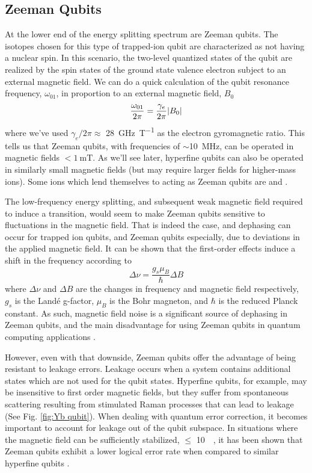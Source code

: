 \subsection{Zeeman Qubits}
At the lower end of the energy splitting spectrum are Zeeman qubits. The isotopes chosen for this type of trapped-ion qubit are characterized as not having a nuclear spin. In this scenario, the two-level quantized states of the qubit are realized by the spin states of the ground state valence electron subject to an external magnetic field. We can do a quick calculation of the qubit resonance frequency, $\omega_{01}$, in proportion to an external magnetic field, $B_0$
\begin{equation}
    \frac{\omega_{01}}{2\pi} = \frac{\gamma_e}{2\pi}\abs{B_0}
\end{equation}
where we've used $\gamma_e/2\pi \approx$ \SI{28}{\giga\hertz\per\tesla} as the electron gyromagnetic ratio. This tells us that Zeeman qubits, with frequencies of $\sim$\SI{10}{\mega\hertz}, can be operated in magnetic fields $< \SI{1}{\milli\tesla}$. As we'll see later, hyperfine qubits can also be operated in similarly small magnetic fields (but may require larger fields for higher-mass ions). Some ions which lend themselves to acting as Zeeman qubits are  and  \cite{Brown, Dietrich}.

The low-frequency energy splitting, and subsequent weak magnetic field required to induce a transition, would seem to make Zeeman qubits sensitive to fluctuations in the magnetic field. That is indeed the case, and dephasing can occur for trapped ion qubits, and Zeeman qubits especially, due to deviations in the applied magnetic field. It can be shown that the first-order effects induce a shift in the frequency according to
\begin{equation}
    \Delta\nu = \frac{g_s \mu_B}{\hbar} \Delta B 
\end{equation}
where $\Delta \nu$ and $\Delta B$ are the changes in frequency and magnetic field respectively, $g_s$ is the Land\'e g-factor, $\mu_B$ is the Bohr magneton, and $\hbar$ is the reduced Planck constant. As such, magnetic field noise is a significant source of dephasing in Zeeman qubits, and the main disadvantage for using Zeeman qubits in quantum computing applications \cite{Bardin, Brown}.

However, even with that downside, Zeeman qubits offer the advantage of being resistant to leakage errors. Leakage occurs when a system contains additional states which are not used for the qubit states. Hyperfine qubits, for example, may be insensitive to first order magnetic fields, but they suffer from spontaneous scattering resulting from stimulated Raman processes that can lead to leakage (See Fig. \ref{fig:Yb qubit}). When dealing with quantum error correction, it becomes important to account for leakage out of the qubit subspace. In situations where the magnetic field can be sufficiently stabilized, $\leq$ \SI{10}{\micro\gauss}, it has been shown that Zeeman qubits exhibit a lower logical error rate when compared to similar hyperfine qubits \cite{Brown}. 

